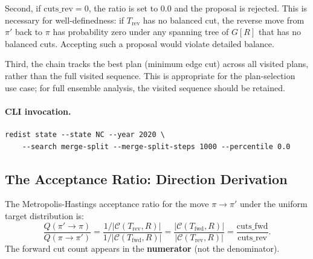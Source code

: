 Second, if $\mathrm{cuts\_rev} = 0$, the ratio is set to $0.0$ and the
proposal is rejected.
This is necessary for well-definedness: if $T_{\mathrm{rev}}$ has no balanced
cut, the reverse move from $\pi'$ back to $\pi$ has probability zero under
any spanning tree of $G[R]$ that has no balanced cuts.
Accepting such a proposal would violate detailed balance.

Third, the chain tracks the best plan (minimum edge cut) across all visited
plans, rather than the full visited sequence.
This is appropriate for the plan-selection use case; for full ensemble
analysis, the visited sequence should be retained.

\paragraph{CLI invocation.}
\begin{verbatim}
redist state --state NC --year 2020 \
    --search merge-split --merge-split-steps 1000 --percentile 0.0
\end{verbatim}

\subsection{The Acceptance Ratio: Direction Derivation}

\begin{proposition}
\label{prop:ratio-direction}
The Metropolis-Hastings acceptance ratio for the move $\pi \to \pi'$
under the uniform target distribution is:
\[
  \frac{Q(\pi' \to \pi)}{Q(\pi \to \pi')}
  = \frac{1 / |\mathcal{C}(T_{\mathrm{rev}}, R)|}
         {1 / |\mathcal{C}(T_{\mathrm{fwd}}, R)|}
  = \frac{|\mathcal{C}(T_{\mathrm{fwd}}, R)|}{|\mathcal{C}(T_{\mathrm{rev}}, R)|}
  = \frac{\mathrm{cuts\_fwd}}{\mathrm{cuts\_rev}}.
\]
The forward cut count appears in the \textbf{numerator} (not the denominator).
\end{proposition}

